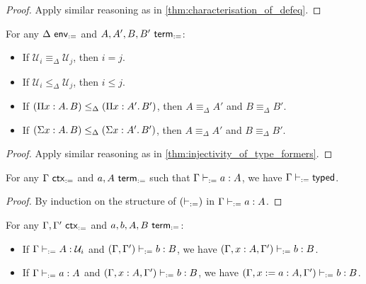 \documentclass[twoside]{report}
\begin{document}
\begin{proof}
    Apply similar reasoning as in \cref{thm:characterisation_of_defeq}.
\end{proof}

\begin{proposition}
    \label{thm:def_injectivity_of_type_formers}
    For any $\Delta \ \mathsf{env}_{:=}$ and $A, A', B, B' \ \mathsf{term}_{:=}$:
    \begin{itemize}[noitemsep]
        \item If $\mathcal U_i \equiv_\Delta \mathcal U_j$, then $i = j$.
        \item If $\mathcal U_i \leq_\Delta \mathcal U_j$, then $i \leq j$.
        \item If $(\Pi{x} : {A}.\,{B}) \leq_\Delta (\Pi{x} : {A'}.\,{B'})$, then $A \equiv_\Delta A'$ and $B \equiv_\Delta B'$.
        \item If $(\Sigma{x} : {A}.\,{B}) \leq_\Delta (\Sigma{x} : {A'}.\,{B'})$, then $A \equiv_\Delta A'$ and $B \equiv_\Delta B'$.
    \end{itemize}
\end{proposition}

\begin{proof}
    Apply similar reasoning as in \cref{thm:injectivity_of_type_formers}.
\end{proof}

\begin{proposition}[Context]
    \label{thm:def_context}
    For any $\Gamma \ \mathsf{ctx}_{:=}$ and $a, A \ \mathsf{term}_{:=}$ such that $\Gamma \vdash_{:=} a : A$, we have $\Gamma \vdash_{:=} \mathsf{typed}$.
\end{proposition}

\begin{proof}
    By induction on the structure of $(\vdash_{:=})$ in $\Gamma \vdash_{:=} a : A$.
\end{proof}

\begin{proposition}[Weakening]
    \label{thm:def_weakening}
    For any $\Gamma, \Gamma' \ \mathsf{ctx}_{:=}$ and $a, b, A, B \ \mathsf{term}_{:=}$:
    \begin{itemize}[noitemsep]
        \item If $\Gamma \vdash_{:=} A : \mathcal U_i$ and $(\Gamma, \Gamma') \vdash_{:=} b : B$, we have $(\Gamma, x : A, \Gamma') \vdash_{:=} b : B$.
        \item If $\Gamma \vdash_{:=} a : A$ and $(\Gamma, x : A, \Gamma') \vdash_{:=} b : B$, we have $(\Gamma, x := a : A, \Gamma') \vdash_{:=} b : B$.
    \end{itemize}
\end{proposition}
\end{document}

